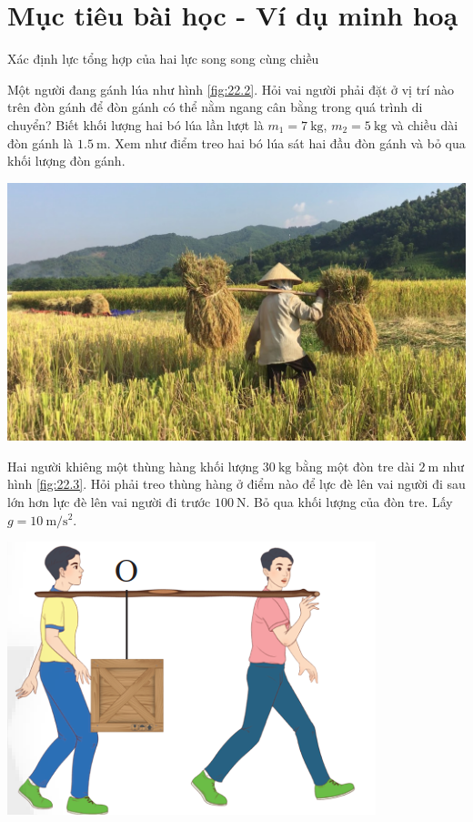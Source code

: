 \section{Mục tiêu bài học - Ví dụ minh hoạ}
\begin{dang}{Xác định lực tổng hợp của hai lực song song cùng chiều}
	{Một người đang gánh lúa như hình \ref{fig:22.2}. Hỏi vai người phải đặt ở vị trí nào trên đòn gánh để đòn gánh có thể nằm ngang cân bằng trong quá trình di chuyển? Biết khối lượng hai bó lúa lần lượt là $m_1=\SI{7}{\kilogram}$, $m_2=\SI{5}{\kilogram}$ và chiều dài đòn gánh là $\SI{1.5}{\meter}$. Xem như điểm treo hai bó lúa sát hai đầu đòn gánh và bỏ qua khối lượng đòn gánh.
	\begin{center}
		\includegraphics[width=0.3\linewidth]{../figs/VN10-2023-PH-TP022-1}
		\label{fig:22.2}
	\end{center}
}
{
}
	{Hai người khiêng một thùng hàng khối lượng $\SI{30}{\kilogram}$ bằng một đòn tre dài $\SI{2}{\meter}$ như hình \ref{fig:22.3}. Hỏi phải treo thùng hàng ở điểm nào để lực đè lên vai người đi sau lớn hơn lực đè lên vai người đi trước $\SI{100}{\newton}$. Bỏ qua khối lượng của đòn tre. Lấy $g=\SI{10}{\meter/\second^2}$.
		\begin{center}
			\includegraphics[width=0.3\linewidth]{../figs/VN10-2023-PH-TP022-3}

\end{center}}
\end{dang}
